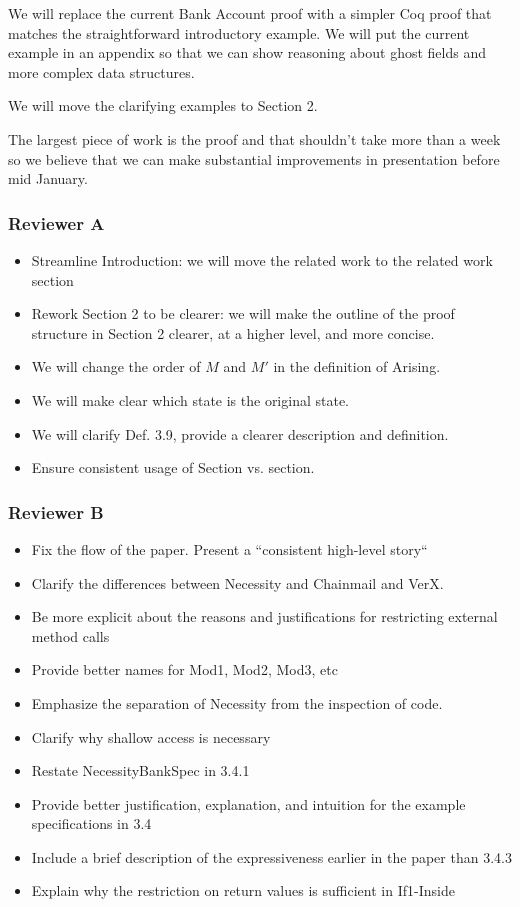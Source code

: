 \documentclass[11pt]{amsart}
\begin{document}
 We will replace the current Bank Account proof with a simpler Coq proof that matches the straightforward introductory example. We will put the current example in an appendix so that we can 
show reasoning about ghost fields and more complex data structures. 

We will move the clarifying examples to Section 2.

The largest piece of work is the proof and that shouldn't take more than a week so we believe that we can make substantial improvements in presentation before mid January.


\subsubsection*{Reviewer A}
\begin{itemize}
\item Streamline Introduction: we will move the related work to the related work section
\item Rework Section 2 to be clearer: we will make the outline of the proof structure in Section 2 clearer, at a higher level, and more concise.
\item We will change the order of $M$ and $M'$ in the definition of Arising.
\item We will make clear which state is the original state.
\item We will clarify Def. 3.9, provide a clearer description and definition.
\item Ensure consistent usage of Section vs. section.
\end{itemize}

\subsubsection*{Reviewer B}
\begin{itemize}
\item Fix the flow of the paper. Present a ``consistent high-level story``
\item Clarify the differences between Necessity and Chainmail and VerX.
\item Be more explicit about the reasons and justifications for restricting external method calls
\item Provide better names for Mod1, Mod2, Mod3, etc
\item Emphasize the separation of Necessity from the inspection of code.
\item Clarify why shallow access is necessary
\item Restate NecessityBankSpec in 3.4.1
\item Provide better justification, explanation, and intuition for the example specifications in 3.4
\item Include a brief description of the expressiveness earlier in the paper than 3.4.3
\item Explain why the restriction on return values is sufficient in If1-Inside
\end{itemize}
\end{document}
